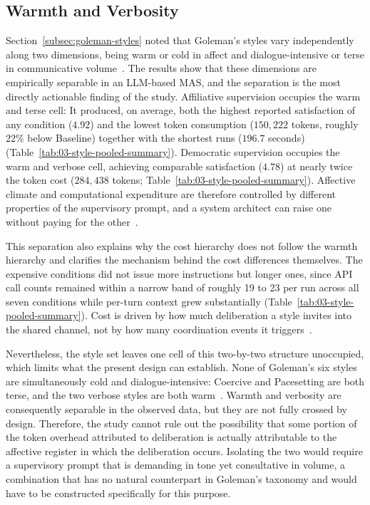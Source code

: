 \subsection{Warmth and Verbosity}
\label{subsec:warmth-verbosity}

Section~\ref{subsec:goleman-styles} noted that Goleman's styles vary independently along two dimensions, being warm or cold in affect and dialogue-intensive or terse in communicative volume~\cite{goleman2000leadership}.
The results show that these dimensions are empirically separable in an \ac{LLM}-based \ac{MAS}, and the separation is the most directly actionable finding of the study.
Affiliative supervision occupies the warm and terse cell: 
It produced, on average, both the highest reported satisfaction of any condition ($4.92$) and the lowest token consumption ($150{,}222$ tokens, roughly $22\%$ below Baseline) together with the shortest runs ($196.7$ seconds) (Table~\ref{tab:03-style-pooled-summary}).
Democratic supervision occupies the warm and verbose cell, achieving comparable satisfaction ($4.78$) at nearly twice the token cost ($284{,}438$ tokens; Table~\ref{tab:03-style-pooled-summary}).
Affective climate and computational expenditure are therefore controlled by different properties of the supervisory prompt, and a system architect can raise one without paying for the other~\cite{zhang2024cutcrapeconomicalcommunication, kwak2026leadershipcoordinationcontrolbehavioral}.

This separation also explains why the cost hierarchy does not follow the warmth hierarchy and clarifies the mechanism behind the cost differences themselves. 
The expensive conditions did not issue more instructions but longer ones, since \ac{API} call counts remained within a narrow band of roughly 19 to 23 per run across all seven conditions while per-turn context grew substantially (Table~\ref{tab:03-style-pooled-summary}).
Cost is driven by how much deliberation a style invites into the shared channel, not by how many coordination events it triggers~\cite{zhang2024cutcrapeconomicalcommunication}.

Nevertheless, the style set leaves one cell of this two-by-two structure unoccupied, which limits what the present design can establish.
None of Goleman's six styles are simultaneously cold and dialogue-intensive: Coercive and Pacesetting are both terse, and the two verbose styles are both warm~\cite{goleman2000leadership}.
Warmth and verbosity are consequently separable in the observed data, but they are not fully crossed by design.
Therefore, the study cannot rule out the possibility that some portion of the token overhead attributed to deliberation is actually attributable to the affective register in which the deliberation occurs.
Isolating the two would require a supervisory prompt that is demanding in tone yet consultative in volume, a combination that has no natural counterpart in Goleman's taxonomy and would have to be constructed specifically for this purpose.

